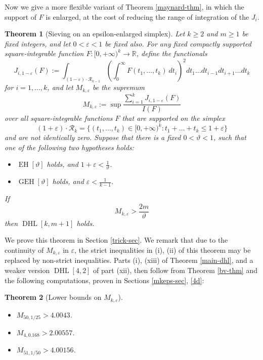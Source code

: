 \documentclass{bmcart}
\DeclareMathOperator*\EH{EH}
\DeclareMathOperator*\GEH{GEH}
\DeclareMathOperator*\DHL{DHL}
\theoremstyle{plain}
\newtheorem{theorem}{Theorem}[section]
\theoremstyle{definition}
\newcommand\R{\mathbb{R}}
\newcommand\eps{\varepsilon}
\begin{document}
Now we give a more flexible variant of Theorem \ref{maynard-thm}, in which the support of $F$ is enlarged, at the cost of reducing the range of integration of the $J_i$.

\begin{theorem}[Sieving on an epsilon-enlarged simplex]\label{epsilon-trick}  Let $k \geq 2$ and $m \geq 1$ be fixed integers, and let $0 < \eps < 1$ be fixed also. For any fixed compactly supported square-integrable function $F: [0,+\infty)^k \to \R$, define the functionals
$$ J_{i,1-\eps}(F) := \int_{(1-\eps) \cdot {\mathcal R}_{k-1}} \left(\int_0^\infty F(t_1,\dots,t_k)\ dt_i\right)^2 dt_1 \dots dt_{i-1} dt_{i+1} \dots dt_k$$
for $i=1,\dots,k$, and let $M_{k,\eps}$ be the supremum
$$ M_{k,\eps} := \sup \frac{\sum_{i=1}^k J_{i,1-\eps}(F)}{I(F)}$$
over all square-integrable functions $F$ that are supported on the simplex
$$ (1+\eps) \cdot {\mathcal R}_k = \{ (t_1,\dots,t_k) \in [0,+\infty)^k: t_1+\dots+t_k \leq 1+\eps \}$$
and are not identically zero.  Suppose that there is a fixed $0 < \vartheta < 1$, such that one of the following two hypotheses holds:
\begin{itemize}
\item[(i)]  $\EH[\vartheta]$ holds, and $1+\eps < \frac{1}{\vartheta}$.
\item[(ii)] $\GEH[\vartheta]$ holds, and $\eps < \frac{1}{k-1}$.
\end{itemize}
If
$$ M_{k,\eps} > \frac{2m}{\vartheta}$$
then $\DHL[k,m+1]$ holds.
\end{theorem}

We prove this theorem in Section \ref{trick-sec}.  We remark that due to the continuity of $M_{k,\eps}$ in $\eps$, the strict inequalities in (i), (ii) of this theorem may be replaced by non-strict inequalities. Parts (i), (xiii) of Theorem \ref{main-dhl}, and a weaker version $\DHL[4,2]$ of part (xii), then follow from Theorem \ref{bv-thm} and the following computations, proven in Sections \ref{mkeps-sec}, \ref{4d}:

\begin{theorem}[Lower bounds on $M_{k,\eps}$]\label{mke-lower}\
\begin{itemize}
\item[(i)] $M_{50,1/25} > 4.0043$.
\item[(xii$'$)] $M_{4,0.168} > 2.00557$.
\item[(xiii)] $M_{51,1/50} > 4.00156$.
\end{itemize}
\end{theorem}
\end{document}
